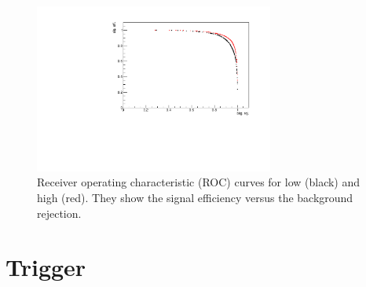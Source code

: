 \begin{figure}
\centering
\includegraphics[width=0.7\textwidth]{Lmumu/figs/ROC.pdf}
\caption{Receiver operating characteristic (ROC) curves for low \qsq (black) and high \qsq (red).
They show the signal efficiency versus the background rejection.}
\label{fig:Lb_ROC}
\end{figure}

%
%




\section{Trigger}

